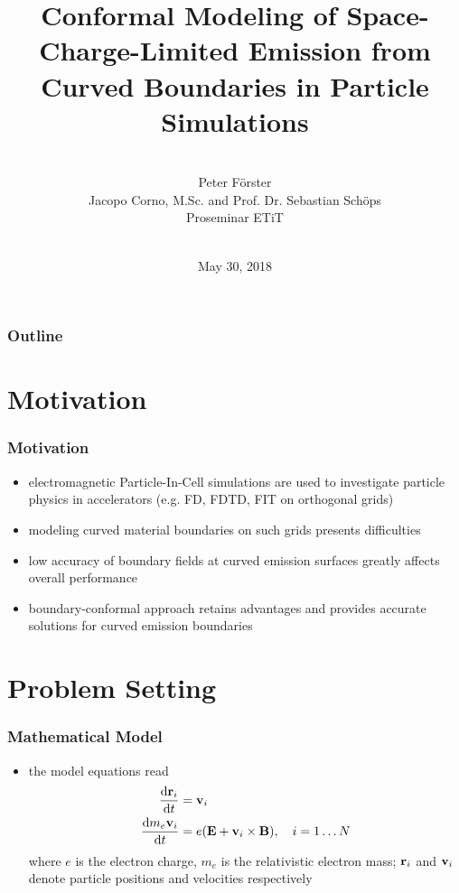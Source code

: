 \documentclass[colorbacktitle,inverttitle,landscape,presentation,
	english,
	aspectratio=43, %
	accentcolor=tud9b, %
]{tudbeamer}
\date{May 30, 2018}
\title{Conformal Modeling of Space-Charge-Limited Emission from Curved Boundaries in Particle Simulations}
\subtitle{\\[0.3\baselineskip]
	Peter Förster\\[0.3\baselineskip]
{\small Jacopo Corno, M.Sc. and Prof. Dr. Sebastian Schöps}\\
[0.3\baselineskip]
{\tiny Proseminar ETiT}\\[0.3em]
	\mbox{\scriptsize}~}
\institute[TU Darmstadt | Fachbereich 18 | Institut Theorie Elektromagnetischer Felder]{Institut für Theorie Elektromagnetischer Felder, TU Darmstadt}
\begin{document}
	
\begin{titleframe}
	\end{titleframe}
	
\begin{frame}
	\frametitle{Outline}
	\tableofcontents%
\end{frame}
	
	
\section{Motivation}
\begin{frame}
\frametitle{Motivation}
	\begin{itemize}
	\item electromagnetic Particle-In-Cell simulations are used to investigate particle physics in accelerators (e.g. FD, FDTD, FIT on orthogonal grids)
	
	\item modeling curved material boundaries on such grids presents difficulties
	
	\item low accuracy of boundary fields at curved emission surfaces greatly affects overall performance
	
	\item boundary-conformal approach retains advantages and provides accurate solutions for curved emission boundaries
	\end{itemize}
\end{frame}
		

\section{Problem Setting}
\begin{frame}
\frametitle{Mathematical Model}
	\begin{itemize}
	\item the model equations read
	\begin{align*}
	\frac{ \mathrm{d} \mathbf{r} _i}{ \mathrm{d} t} &=  \mathbf{v} _i\\
	\frac{ \mathrm{d} m_e \mathbf{v} _i}{ \mathrm{d} t} &= e( \mathbf{E}  +  \mathbf{v} _i\times \mathbf{B} ),\quad i = 1\dots N
	\end{align*}
	where $e$ is the electron charge, $m_e$ is the relativistic electron mass; $ \mathbf{r} _i$ and $ \mathbf{v} _i$ denote particle positions and velocities respectively
	\end{itemize}
\end{frame}
\end{document}
